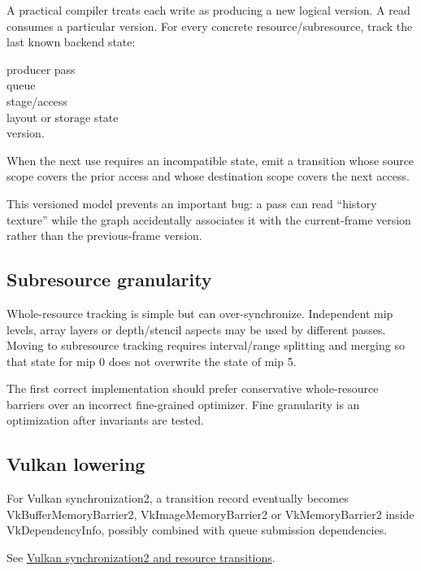 A practical compiler treats each write as producing a new logical version. A read consumes a particular version. For every concrete resource/subresource, track the last known backend state:

producer pass\\
queue\\
stage/access\\
layout or storage state\\
version.

When the next use requires an incompatible state, emit a transition whose source scope covers the prior access and whose destination scope covers the next access.

This versioned model prevents an important bug: a pass can read ``history texture'' while the graph accidentally associates it with the current-frame version rather than the previous-frame version.

\subsection{Subresource granularity}\label{appendix-0fc95374cb7e-subresource-granularity}

\hypertarget{appendix-0fc95374cb7e-subresource-granularity}{}

Whole-resource tracking is simple but can over-synchronize. Independent mip levels, array layers or depth/stencil aspects may be used by different passes. Moving to subresource tracking requires interval/range splitting and merging so that state for mip 0 does not overwrite the state of mip 5.

The first correct implementation should prefer conservative whole-resource barriers over an incorrect fine-grained optimizer. Fine granularity is an optimization after invariants are tested.

\subsection{Vulkan lowering}\label{appendix-0fc95374cb7e-vulkan-lowering}

\hypertarget{appendix-0fc95374cb7e-vulkan-lowering}{}

For Vulkan synchronization2, a transition record eventually becomes VkBufferMemoryBarrier2, VkImageMemoryBarrier2 or VkMemoryBarrier2 inside VkDependencyInfo, possibly combined with queue submission dependencies.

See \hyperref[appendix-f15ce0d9c170]{Vulkan synchronization2 and resource transitions}.


